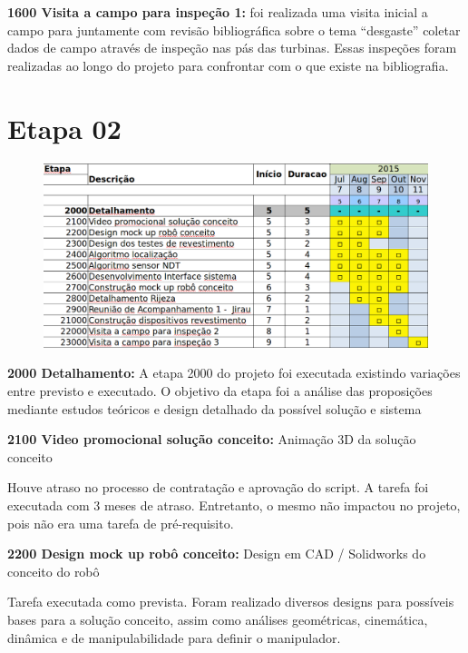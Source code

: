 \noindent
\textbf{1600 Visita a campo para inspeção 1:} foi realizada uma visita inicial
a campo para juntamente com revisão bibliográfica sobre o tema “desgaste”
coletar dados de campo através de inspeção nas pás das turbinas. Essas inspeções
foram realizadas ao longo do projeto para confrontar com o que existe na
bibliografia.


\section{Etapa 02}

\begin{figure}[H]
\centering
\includegraphics[width=0.9\columnwidth]{figs/etapa2}
\end{figure} 

\noindent
\textbf{2000 Detalhamento:} A etapa 2000 do projeto foi executada existindo
variações entre previsto e executado. O objetivo da etapa foi a análise das
proposições mediante estudos teóricos e design detalhado da possível solução e sistema

\noindent
\textbf{2100 Video promocional solução conceito:} Animação 3D da solução
conceito

Houve atraso no processo de contratação e aprovação do script. A tarefa foi
executada com 3 meses de atraso. Entretanto, o mesmo não impactou no projeto,
pois não era uma tarefa de pré-requisito.

\noindent
\textbf{2200 Design mock up robô conceito:} Design em CAD / Solidworks do
conceito do robô

Tarefa executada como prevista. Foram realizado diversos designs para possíveis
bases para a solução conceito, assim como análises geométricas, cinemática,
dinâmica e de manipulabilidade para definir o manipulador.

